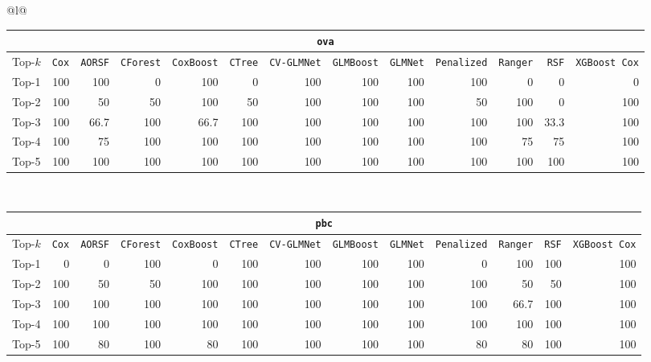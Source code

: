 \begin{longtable}{@{}l@{}}
\begin{tabular}{@{}l*{12}{r}@{}}
\multicolumn{13}{c}{\texttt{ova}} \\
\midrule
Top-$k$ & \texttt{Cox} & \texttt{AORSF} & \texttt{CForest} & \texttt{CoxBoost} & \texttt{CTree} & \texttt{CV-GLMNet} & \texttt{GLMBoost} & \texttt{GLMNet} & \texttt{Penalized} & \texttt{Ranger} & \texttt{RSF} & \texttt{XGBoost Cox} \\
\midrule
Top-1 & 100 & 100 & 0 & 100 & 0 & 100 & 100 & 100 & 100 & 0 & 0 & 0 \\
Top-2 & 100 & 50 & 50 & 100 & 50 & 100 & 100 & 100 & 50 & 100 & 0 & 100 \\
Top-3 & 100 & 66.7 & 100 & 66.7 & 100 & 100 & 100 & 100 & 100 & 100 & 33.3 & 100 \\
Top-4 & 100 & 75 & 100 & 100 & 100 & 100 & 100 & 100 & 100 & 75 & 75 & 100 \\
Top-5 & 100 & 100 & 100 & 100 & 100 & 100 & 100 & 100 & 100 & 100 & 100 & 100 \\
\end{tabular} \\
\midrule

\begin{tabular}{@{}l*{12}{r}@{}}
\multicolumn{13}{c}{\texttt{pbc}} \\
\midrule
Top-$k$ & \texttt{Cox} & \texttt{AORSF} & \texttt{CForest} & \texttt{CoxBoost} & \texttt{CTree} & \texttt{CV-GLMNet} & \texttt{GLMBoost} & \texttt{GLMNet} & \texttt{Penalized} & \texttt{Ranger} & \texttt{RSF} & \texttt{XGBoost Cox} \\
\midrule
Top-1 & 0 & 0 & 100 & 0 & 100 & 100 & 100 & 100 & 0 & 100 & 100 & 100 \\
Top-2 & 100 & 50 & 50 & 100 & 100 & 100 & 100 & 100 & 100 & 50 & 50 & 100 \\
Top-3 & 100 & 100 & 100 & 100 & 100 & 100 & 100 & 100 & 100 & 66.7 & 100 & 100 \\
Top-4 & 100 & 100 & 100 & 100 & 100 & 100 & 100 & 100 & 100 & 100 & 100 & 100 \\
Top-5 & 100 & 80 & 100 & 80 & 100 & 100 & 100 & 100 & 80 & 80 & 100 & 100 \\
\end{tabular} \\
\midrule


\end{longtable}
